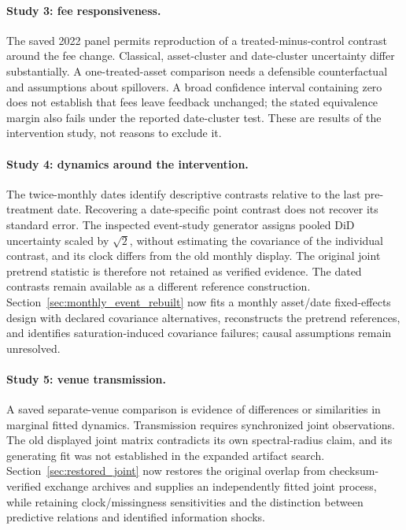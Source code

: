 \paragraph{Study 3: fee responsiveness.}
The saved 2022 panel permits reproduction of a treated-minus-control contrast around the fee change. Classical, asset-cluster and date-cluster uncertainty differ substantially. A one-treated-asset comparison needs a defensible counterfactual and assumptions about spillovers. A broad confidence interval containing zero does not establish that fees leave feedback unchanged; the stated equivalence margin also fails under the reported date-cluster test. These are results of the intervention study, not reasons to exclude it.

\paragraph{Study 4: dynamics around the intervention.}
The twice-monthly dates identify descriptive contrasts relative to the last pre-treatment date. Recovering a date-specific point contrast does not recover its standard error. The inspected event-study generator assigns pooled DiD uncertainty scaled by $\sqrt2$, without estimating the covariance of the individual contrast, and its clock differs from the old monthly display. The original joint pretrend statistic is therefore not retained as verified evidence. The dated contrasts remain available as a different reference construction. Section~\ref{sec:monthly_event_rebuilt} now fits a monthly asset/date fixed-effects design with declared covariance alternatives, reconstructs the pretrend references, and identifies saturation-induced covariance failures; causal assumptions remain unresolved.

\paragraph{Study 5: venue transmission.}
A saved separate-venue comparison is evidence of differences or similarities in marginal fitted dynamics. Transmission requires synchronized joint observations. The old displayed joint matrix contradicts its own spectral-radius claim, and its generating fit was not established in the expanded artifact search. Section~\ref{sec:restored_joint} now restores the original overlap from checksum-verified exchange archives and supplies an independently fitted joint process, while retaining clock/missingness sensitivities and the distinction between predictive relations and identified information shocks.

